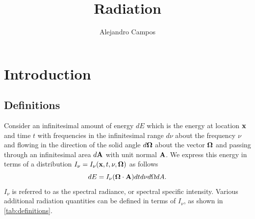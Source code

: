 \documentclass[a4paper,11pt]{report}
\title{Radiation}
\author{Alejandro Campos}
\begin{document}
\maketitle
\tableofcontents

\chapter{Introduction}

\section{Definitions}
Consider an infinitesimal amount of energy $dE$ which is the energy at location $\mathbf{x}$ and time $t$ with frequencies in the infinitesimal range $d\nu$ about the frequency $\nu$ and flowing in the direction of the solid angle $d\bm \Omega$ about the vector $\bm \Omega$ and passing through an infinitesimal area $d\mathbf{A}$ with unit normal $\mathbf{A}$. We express this energy in terms of a distribution $I_\nu = I_\nu(\mathbf{x}, t, \nu, \bm \Omega)$ as follows
\begin{equation}
    dE = I_\nu (\bm \Omega \cdot \mathbf{A}) dt d\nu d\Omega dA.
\end{equation}
$I_\nu$ is referred to as the spectral radiance, or spectral specific intensity. Various additional radiation quantities can be defined in terms of $I_\nu$, as shown in \cref{tab:definitions}.

\setlength{\cellspacetoplimit}{3pt}
\setlength{\cellspacebottomlimit}{3pt}
\end{document}
